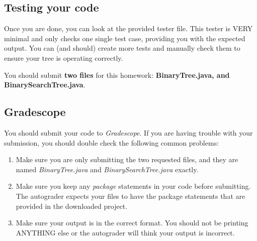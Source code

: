 \documentclass[paper=a4, fontsize=11pt, parskip=full]{scrartcl} %
\numberwithin{equation}{section} %
\numberwithin{figure}{section} %
\numberwithin{table}{section} %
\begin{document}
\subsection{Testing your code}

Once you are done, you can look at the provided tester file. This tester is VERY minimal and only checks one single test case, providing you with the expected output. You can (and should) create more tests and manually check them to ensure your tree is operating correctly.

You should submit \textbf{two files} for this homework: \textbf{BinaryTree.java, and BinarySearchTree.java}.

\subsection{Gradescope}

You should submit your code to \emph{Gradescope}. If you are having trouble with your submission, you should double check the following common problems:

\begin{enumerate}
	\item Make sure you are only submitting the two requested files, and they are named \emph{BinaryTree.java} and \emph{BinarySearchTree.java} exactly.
	\item Make sure you keep any \emph{package} statements in your code before submitting. The autograder expects your files to have the package statements that are provided in the downloaded project.
	\item Make sure your output is in the correct format. You should not be printing ANYTHING else or the autograder will think your output is incorrect.
\end{enumerate}




\end{document}
